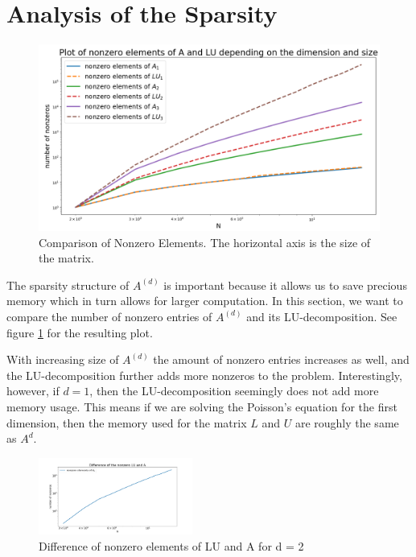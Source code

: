 \documentclass[refman]{article}
\theoremstyle{definition}
\begin{document}
\section{Analysis of the Sparsity}

\begin{figure}[h]
	\includegraphics[width=\linewidth]{graphics/sparsity.png}
	\caption{Comparison of Nonzero Elements. The horizontal axis is the size of the matrix.}
	\label{fig:boat1}
\end{figure}

The sparsity structure of \(A^{(d)}\) is important because it allows us to save precious memory which in turn allows for larger computation. In this section, we want to compare the number of nonzero entries of \(A^{(d)}\) and its LU-decomposition. See figure \ref{fig:boat1} for the resulting plot.

With increasing size of \(A^{(d)}\) the amount of nonzero entries increases as well, and the LU-decomposition further adds more nonzeros to the problem. Interestingly, however, if \(d = 1\), then the LU-decomposition seemingly does not add more memory usage. This means if we are solving the Poisson's equation for the first dimension, then the memory used for the matrix \(L\) and \(U\) are roughly the same as \(A^{d}\).

\begin{figure}
	\includegraphics[width=0.45\textwidth]{graphics/line.png}
	\caption{Difference of nonzero elements of LU and A for d = 2}
	\label{fig:Line}
\end{figure}
\end{document}
